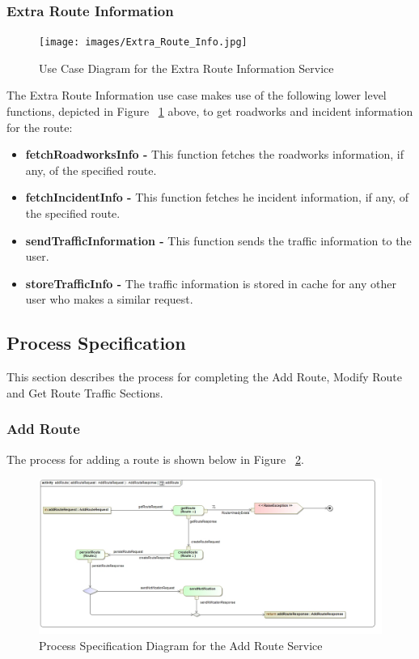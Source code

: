 \documentclass[a4paper,12pt]{article}
\begin{document}
\subsubsection{Extra Route Information}
\begin{figure}[ht]
\texttt{[image: images/Extra\_Route\_Info.jpg]}
\caption{Use Case Diagram for the Extra Route Information Service}
\label{fig:uc_extra}
\end{figure}

The Extra Route Information use case makes use of the following lower level functions, depicted in Figure ~\ref{fig:uc_extra} above, to get roadworks and incident information for the route:

\begin{itemize}
\item \textbf{fetchRoadworksInfo -} This function fetches the roadworks information, if any, of the specified route.
\item \textbf{fetchIncidentInfo -} This function fetches he incident information, if any, of the specified route.
\item \textbf{sendTrafficInformation -} This function sends the traffic information to the user.
\item \textbf{storeTrafficInfo -} The traffic information is stored in cache for any other user who makes a similar request.
\end{itemize}

\subsection{Process Specification}
This section describes the process for completing the Add Route, Modify Route and Get Route Traffic Sections.
\subsubsection{Add Route}
The process for adding a route is shown below in Figure ~\ref{fig:ps_add}.
\begin{figure}[ht]
\includegraphics[width=\textwidth]{images/psAdd_Route.jpg}
\caption{Process Specification Diagram for the Add Route Service}
\label{fig:ps_add}
\end{figure}
\end{document}
